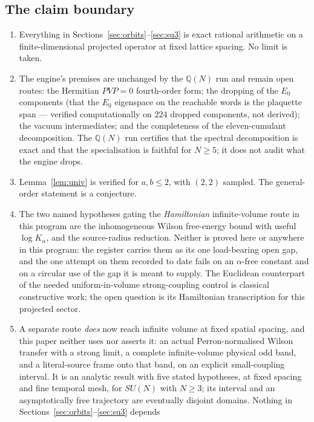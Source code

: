 \documentclass[11pt]{article}
\theoremstyle{definition}
\theoremstyle{remark}
\newcommand{\Q}{\mathbb{Q}}
\begin{document}
\subsection{The claim boundary}

\begin{enumerate}\itemsep3pt
\item Everything in Sections~\ref{sec:orbits}--\ref{sec:su3} is exact rational
  arithmetic on a finite-dimensional projected operator at fixed lattice
  spacing. No limit is taken.
\item The engine's premises are unchanged by the $\Q(N)$ run and remain open
  routes: the Hermitian $PVP=0$ fourth-order form; the dropping of the $E_0$
  components (that the $E_0$ eigenspace on the reachable words is the plaquette
  span --- verified computationally on $224$ dropped components, not derived);
  the vacuum intermediates; and the completeness of the eleven-cumulant
  decomposition. The $\Q(N)$ run certifies that the spectral decomposition is
  exact and that the specialisation is faithful for $N\ge5$; it does not audit
  what the engine drops.
\item Lemma~\ref{lem:univ} is verified for $a,b\le2$, with $(2,2)$ sampled.
  The general-order statement is a conjecture.
\item The two named hypotheses gating the \emph{Hamiltonian} infinite-volume
  route in this program are the inhomogeneous Wilson free-energy bound with
  useful $\log K_\alpha$, and the source-radius reduction. Neither is proved
  here or anywhere in this program: the register carries them as its one
  load-bearing open gap, and the one attempt on them recorded to date fails on
  an $\alpha$-free constant and on a circular use of the gap it is meant to
  supply. The Euclidean counterpart of the needed uniform-in-volume
  strong-coupling control is classical constructive work; the open question is
  its Hamiltonian transcription for this projected sector.
\item A separate route \emph{does} now reach infinite volume at fixed spatial
  spacing, and this paper neither uses nor asserts it: an actual
  Perron-normalised Wilson transfer with a strong limit, a complete
  infinite-volume physical odd band, and a literal-source frame onto that band,
  on an explicit small-coupling interval. It is an analytic result with five
  stated hypotheses, at fixed spacing and fine temporal mesh, for $SU(N)$ with
  $N\ge3$; its interval and an asymptotically free trajectory are eventually
  disjoint domains. Nothing in Sections~\ref{sec:orbits}--\ref{sec:su3} depends

\end{enumerate}
\end{document}
